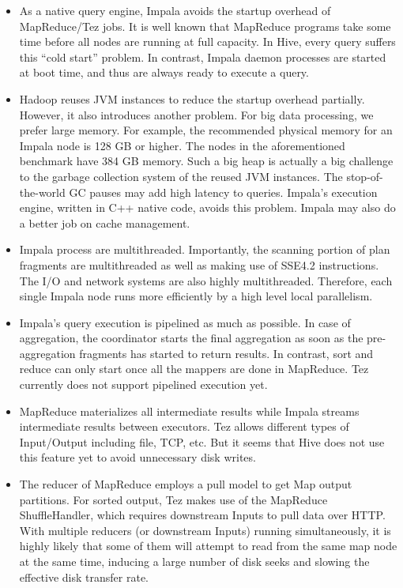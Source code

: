 \documentclass[12pt]{book}
\begin{document}
\begin{itemize}
\item As a native query engine, Impala avoids the startup overhead of MapReduce/Tez jobs. It is well known that MapReduce programs take some time before all nodes are running at full capacity. In Hive, every query suffers this ``cold start'' problem. In contrast, Impala daemon processes are started at boot time, and thus are always ready to execute a query.
\item Hadoop reuses JVM instances to reduce the startup overhead partially. However, it also introduces another problem. For big data processing, we prefer large memory. For example, the recommended physical memory for an Impala node is 128 GB or higher. The nodes in the aforementioned benchmark have 384 GB memory. Such a big heap is actually a big challenge to the garbage collection system of the reused JVM instances. The stop-of-the-world GC pauses may add high latency to queries. Impala's execution engine, written in C++ native code, avoids this problem. Impala may also do a better job on cache management.
\item Impala process are multithreaded. Importantly, the scanning portion of plan fragments are multithreaded as well as making use of SSE4.2 instructions. The I/O and network systems are also highly multithreaded. Therefore, each single Impala node runs more efficiently by a high level local parallelism. 
\item Impala's query execution is pipelined as much as possible. In case of aggregation, the coordinator starts the final aggregation as soon as the pre-aggregation fragments has started to return results. In contrast, sort and reduce can only start once all the mappers are done in MapReduce. Tez currently does not support pipelined execution yet.
\item MapReduce materializes all intermediate results while Impala streams intermediate results between executors. Tez allows different types of Input/Output including file, TCP, etc. But it seems that Hive does not use this feature yet to avoid unnecessary disk writes.
\item The reducer of MapReduce employs a pull model to get Map output partitions. For sorted output, Tez makes use of the MapReduce ShuffleHandler, which requires downstream Inputs to pull data over HTTP. With multiple reducers (or downstream Inputs) running simultaneously, it is highly likely that some of them will attempt to read from the same map node at the same time, inducing a large number of disk seeks and slowing the effective disk transfer rate.

\end{itemize}
\end{document}
